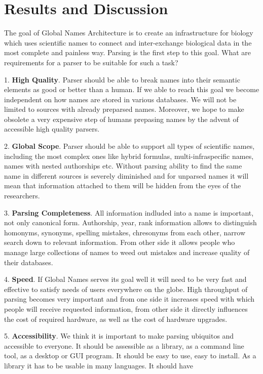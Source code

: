 \documentclass{bmcart}
\begin{document}
\section*{Results and Discussion}

The goal of Global Names Architecture is to create an infrastructure for
biology which uses scientific names to connect and inter-exchange biological
data in the most complete and painless way. Parsing is the first step to this
goal. What are requirements for a parser to be suitable for such a task?

1. \textbf{High Quality}. Parser should be able to break names into their
semantic elements as good or better than a human. If we able to reach this
goal we become independent on how names are stored in various databases. We
will not be limited to sources with already preparsed names. Moreover, we hope
to make obsolete a very expensive step of humans prepasing names by the
advent of accessible high quality parsers.

2. \textbf{Global Scope}. Parser should be able to support all types of
scientific names, including the most complex ones like hybrid formulas,
multi-infraspecific names, names with nested authorships etc. Without parsing
ability to find the same name in different sources is severely diminished
and for unparsed names it will mean that information attached to them will be
hidden from the eyes of the researchers.

3. \textbf{Parsing Completeness}. All information indluded into a name is
important, not only canonical form. Authorship, year, rank information allows
to distinguish homonyms, synonyms, spelling mistakes, chresonyms from each
other, narrow search down to relevant information. From other side it allows
people who manage large collections of names to weed out mistakes and
increase quality of their databases.

4. \textbf{Speed}. If Global Names serves its goal well it will need to be
very fast and effective to satisfy needs of users everywhere on the globe.
High throughput of parsing becomes very important and from one side it
increases speed with which people will receive requested information, from
other side it directly influences the cost of required hardware, as well as
the cost of hardware upgrades.

5. \textbf{Accessibility}. We think it is important to make parsing ubiquitos
and accessible to everyone. It should be assessible as a library, as a command
line tool, as a desktop or GUI program. It should be easy to use, easy to
install. As a library it has to be usable in many languages. It should have
\end{document}
